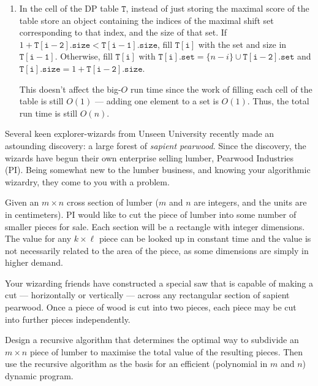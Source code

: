 \documentclass[12 pt, letterpaper]{hmcpset}
\begin{document}
\begin{solution}
\begin{enumerate}
			Specifically, we set
			\[
				\mathtt{T[i]} = \max ( \mathtt{A[n - i]} + \mathtt{T[i - 2]}, \mathtt{T[i - 1]}).
			\]
			Since this agrees with our previous recursive algorithm, we have $\mathtt{T[n - 1]} = \mathtt{shifts(A[1, \dots, n])}$ as desired.

			While filling each cell, the necessary previous cells have been filled. Thus, each cell can be filled in constant time. Since there are $n$ cells, the algorithm runs in $O(n)$ time.

		\item In the cell of the DP table $\mathtt{T}$, instead of just storing the maximal score of the table store an object containing the indices of the maximal shift set corresponding to that index, and the size of that set. If $1 + \mathtt{T[i - 2].size} < \mathtt{T[i - 1].size}$, fill $\mathtt{T[i]}$ with the set and size in $\mathtt{T[i - 1]}$. Otherwise, fill $\mathtt{T[i]}$ with $\mathtt{T[i].set} = \{ n - i \} \cup \mathtt{T[i - 2].set}$ and $\mathtt{T[i].size} = 1 + \mathtt{T[i - 2].size}$.

			This doesn't affect the big-$O$ run time since the work of filling each cell of the table is still $O(1)$ --- adding one element to a set is $O(1)$. Thus, the total run time is still $O(n)$.
	\end{enumerate}
\end{solution}

\pagebreak

\begin{problem}
	Several keen explorer-wizards from Unseen University recently made an astounding discovery: a large forest of \emph{sapient pearwood}. Since the discovery, the wizards have begun their own enterprise selling lumber, Pearwood Industries (PI). Being somewhat new to the lumber business, and knowing your algorithmic wizardry, they come to you with a problem.

	Given an $m \times n$ cross section of lumber ($m$ and $n$ are integers, and the units are in centimeters). PI would like to cut the piece of lumber into some number of smaller pieces for sale. Each section will be a rectangle with integer dimensions. The value for any $k \times \ell$ piece can be looked up in constant time and the value is not necessarily related to the area of the piece, as some dimensions are simply in higher demand.

	Your wizarding friends have constructed a special saw that is capable of making a cut --- horizontally or vertically --- across any rectangular section of sapient pearwood. Once a piece of wood is cut into two pieces, each piece may be cut into further pieces independently.

	Design a recursive algorithm that determines the optimal way to subdivide an $m \times n$ piece of lumber to maximise the total value of the resulting pieces. Then use the recursive algorithm as the basis for an efficient (polynomial in $m$ and $n$) dynamic program.
\end{problem}
\end{document}
